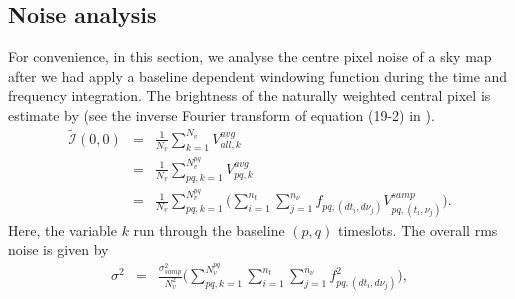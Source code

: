 \documentclass[useAMS,usenatbib]{mn2e}
\begin{document}
\subsection{Noise  analysis}
For convenience, in this section, we  analyse the centre pixel noise of a sky map after we had apply a baseline dependent windowing 
function during the time and frequency integration. The brightness of the 
naturally weighted central pixel is estimate by (see the inverse Fourier transform of equation (19-2) in 
\cite{1} ).
\begin{eqnarray*}
\widetilde{\mathcal{I}}(0,0)&=&\frac{1}{N_{v}}   \sum_{k=1}^{N_{v}} V_{all,k}^{avg}\\
	          &=&\frac{1}{N_{v}}   \sum_{pq,k=1}^{N_{v}^{pq}} V_{pq,k}^{avg}\\
	          &=&\frac{1}{N_{v}}   \sum_{pq,k=1}^{N_{v}^{pq}}\Big(\sum_{i=1}^{n_t}\sum_{j=1}^{n_{\nu}} 
f_{pq,(dt_i,d\nu_j)}V_{pq,(t_i,\nu_j)}^{samp}\Big).
\end{eqnarray*}
Here, the variable $k$ run through the baseline $(p,q)$ timeslots. The  overall rms noise is given by
\begin{eqnarray*}
\sigma^2	&=& 
\frac{\sigma^{2}_{samp} }{N_{v}^{2}}\Big(\sum_{pq,k=1}^{N_{v}^{pq}}\sum_{i=1}^{n_t}\sum_{j=1}^{n_{\nu}}f_{pq,(dt_i,d\nu_j)}^{2}\Big) 
,\label{Equ:BDWnoise}
\end{eqnarray*}
\end{document}
